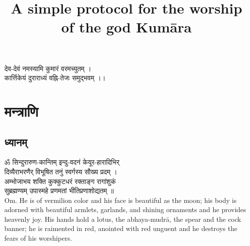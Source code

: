 \documentclass[13pt]{article}
\title{\textbf{A simple protocol for the worship of the god Kumāra}}
\author{}
\date{}
\begin{document}
\maketitle
\begin{center}
{\skt
देव-देवं नमस्यामि कुमारं वरमच्युतम् ।\\
कार्त्तिकेयं दुराराध्यं वह्नि-तेजः समुद्भवम् ।। 
}\\
 \end{center}
\section{{\skt मन्त्राणि}}
\subsection{{\skt ध्यानम् }}
{\skt ॐ सिन्दुरारुण-कान्तिम् इन्दु-वदनं केयूर-हारादिभिर् \\
दिव्यैराभरणैर् विभूषित तनुं स्वर्गस्य सौख्य प्रदम् ।\\ 
अम्भोजाभय शक्ति कुक्कुटधरं रक्ताङ्ग रागांशुकं \\
सुब्रह्मण्यम् उपास्महे प्रणमतां भीतिप्रणाशोद्यतम् ॥
}\\[8pt]
Om. He is of vermilion color and his face is beautiful as the moon; his body is adorned with beautiful armlets, garlands, and shining ornaments and he provides heavenly joy. His hands hold a lotus, the abhaya-mudrā, the spear and the cock banner; he is raimented in red, anointed with red unguent and he destroys the fears of his worshipers.
\end{document}
